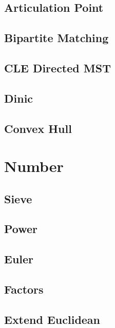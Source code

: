 \subsection{Articulation Point}


\subsection{Bipartite Matching}


\subsection{CLE Directed MST}


\subsection{Dinic}


\subsection{Convex Hull}

\section{Number}

\subsection{Sieve}


\subsection{Power}


\subsection{Euler}


\subsection{Factors}


\subsection{Extend Euclidean}


